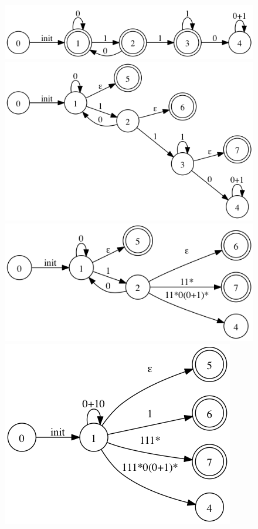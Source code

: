 \documentclass[paper=a4, fontsize=11pt]{scrartcl} %
\begin{document}
\begin{figure}[hp]
  \centering
  \includegraphics[scale=.5]{1-2.gv.png}
  \includegraphics[scale=.5]{1-2.gv.2.png}
  \includegraphics[scale=.5]{1-2.gv.3.png}
  \includegraphics[scale=.5]{1-2.gv.4.png}

\end{figure}
\end{document}
